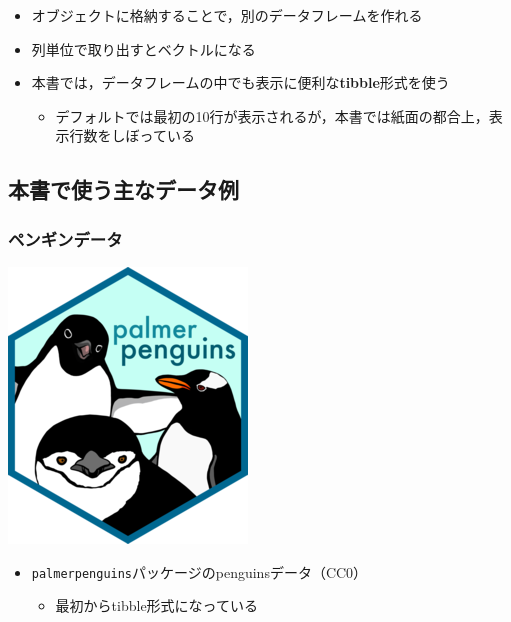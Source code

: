 \documentclass[
  xelatex,ja=standard, b5paper]{bxjsbook}
\providecommand{\tightlist}{%
  \setlength{\itemsep}{0pt}\setlength{\parskip}{0pt}}
\begin{document}
\begin{itemize}
\tightlist
\item
  オブジェクトに格納することで，別のデータフレームを作れる
\item
  列単位で取り出すとベクトルになる
\item
  本書では，データフレームの中でも表示に便利な\textbf{tibble}形式を使う

  \begin{itemize}
  \tightlist
  \item
    デフォルトでは最初の10行が表示されるが，本書では紙面の都合上，表示行数をしぼっている
  \end{itemize}
\end{itemize}

\hypertarget{p-df-main}{%
\subsection{本書で使う主なデータ例}\label{p-df-main}}

\hypertarget{p-df-main-p}{%
\subsubsection{ペンギンデータ}\label{p-df-main-p}}

\includegraphics{images/penguins_logo.png}

\begin{itemize}
\tightlist
\item
  \texttt{palmerpenguins}パッケージのpenguinsデータ（CC0）

  \begin{itemize}
  \tightlist
  \item
    最初からtibble形式になっている
  \end{itemize}
\end{itemize}
\end{document}
